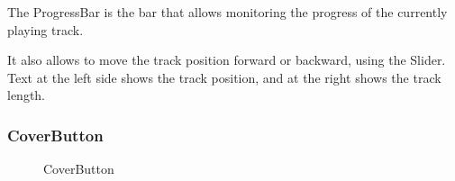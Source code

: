 \documentclass{article}
\begin{document}
The ProgressBar is the bar that allows monitoring the progress of the currently
playing track.

It also allows to move the track position forward or backward,
using the Slider. Text at the left side shows the track position, and at the
right shows the track length.

\subsubsection{CoverButton}

\begin{figure}[H]
	\noindent
	\caption{CoverButton} 
\end{figure}
\end{document}
